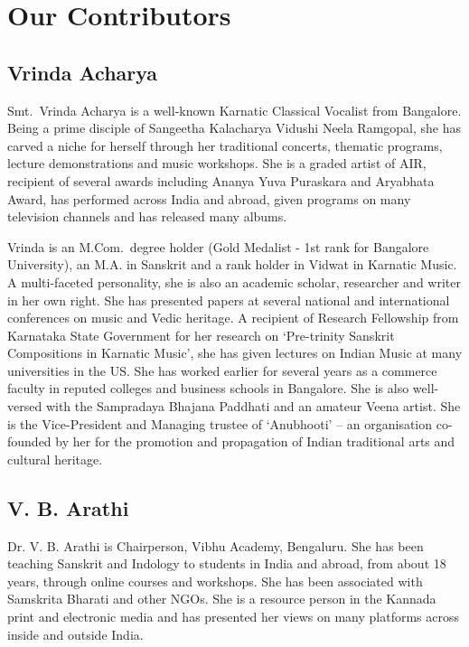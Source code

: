 
\chapter*{Our Contributors }\label{contributors}

\section*{Vrinda Acharya}

Smt.~Vrinda Acharya is a well-known Karnatic Classical Vocalist from Bangalore. Being a prime disciple of Sangeetha Kalacharya Vidushi Neela Ramgopal, she has carved a niche for herself through her traditional concerts, thematic programs, lecture demonstrations and music workshops. She is a graded artist of AIR, recipient of several awards including Ananya Yuva Puraskara and Aryabhata Award, has performed across India and abroad, given programs on many television channels and has released many albums.

Vrinda is an M.Com.~degree holder (Gold Medalist - 1st rank for Bangalore University), an M.A. in Sanskrit and a rank holder in Vidwat in Karnatic Music. A multi-faceted personality, she is also an academic scholar, researcher and writer in her own right. She has presented papers at several national and international conferences on music and Vedic heritage. A recipient of Research Fellowship from Karnataka State Government for her research on ‘Pre-trinity Sanskrit Compositions in Karnatic Music’, she has given lectures on Indian Music at many universities in the US. She has worked earlier for several years as a commerce faculty in reputed colleges and business schools in Bangalore. She is also well-versed with the Sampradaya Bhajana Paddhati and an amateur Veena artist. She is the Vice-President and Managing trustee of ‘Anubhooti’ – an organisation co-founded by her for the promotion and propagation of Indian traditional arts and cultural heritage.

\newpage

\section*{V. B. Arathi}

\vspace{-.2cm}

Dr. V. B. Arathi is Chairperson, Vibhu Academy, Bengaluru. She has been teaching Sanskrit and Indology to students in India and abroad, from about 18 years, through online courses and workshops. She has been associated with Samskrita Bharati and other NGOs. She is a resource person in the Kannada print and electronic media and has presented her views on many platforms across inside and outside India.

